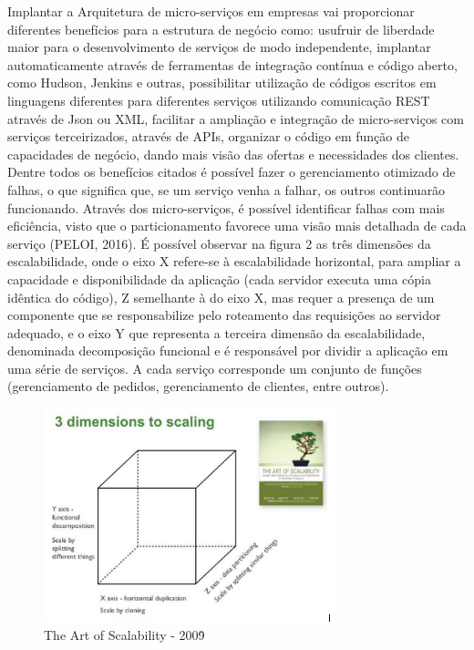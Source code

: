 Implantar a Arquitetura de micro-serviços em empresas vai proporcionar diferentes benefícios para a estrutura de negócio como: usufruir de liberdade maior para o desenvolvimento de serviços de modo independente, implantar automaticamente através de ferramentas de integração contínua e código aberto, como Hudson, Jenkins e outras, possibilitar utilização de códigos escritos em linguagens diferentes para diferentes serviços utilizando comunicação REST através de Json ou XML, facilitar a ampliação e integração de micro-serviços com serviços terceirizados, através de APIs, organizar o código em função de capacidades de negócio, dando mais visão das ofertas e necessidades dos clientes. Dentre todos os benefícios citados é possível fazer o gerenciamento otimizado de falhas, o que significa que, se um serviço venha a falhar, os outros continuarão funcionando. Através dos micro-serviços, é possível identificar falhas com mais eficiência, visto que o particionamento favorece uma visão mais detalhada de cada serviço (PELOI, 2016). É possível observar na figura 2 as três dimensões da escalabilidade, onde o eixo X refere-se à escalabilidade horizontal, para ampliar a capacidade e disponibilidade da aplicação (cada servidor executa uma cópia idêntica do código), Z semelhante à do eixo X,  mas requer a presença de um componente que se responsabilize pelo roteamento das requisições ao servidor adequado, e o eixo Y que representa a terceira dimensão da escalabilidade, denominada decomposição funcional e é responsável por dividir a aplicação em uma série de serviços. A cada serviço corresponde um conjunto de funções (gerenciamento de pedidos, gerenciamento de clientes, entre outros).

\begin{figure}[h]
\centering
\includegraphics[height=6.2cm]{imagens/scalability}
\caption{The Art of Scalability - 2009\.}
\label{fig:exemplo}
\end{figure}


